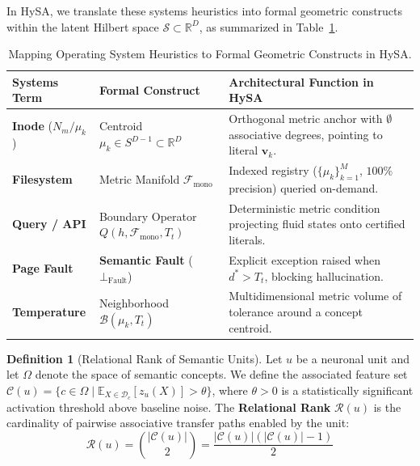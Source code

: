 \documentclass[11pt,a4paper]{article}
\theoremstyle{definition}
\newtheorem{definition}{Definition}
\begin{document}
In HySA, we translate these systems heuristics into formal geometric constructs within the latent Hilbert space $\mathcal{S} \subset \mathbb{R}^D$, as summarized in Table~\ref{tab:systems_mapping}.

\begin{table}[h]
\centering
\caption{Mapping Operating System Heuristics to Formal Geometric Constructs in HySA.}
\label{tab:systems_mapping}
\vspace{0.15cm}
\small
\setlength{\tabcolsep}{4.0pt}
\begin{tabular}{@{}p{3.2cm}p{3.8cm}p{8.5cm}@{}}
\toprule
\textbf{Systems Term} & \textbf{Formal Construct} & \textbf{Architectural Function in HySA} \\ \midrule
\textbf{Inode} ($N_m / \mu_k$) & Centroid $\mu_k \in S^{D-1} \subset \mathbb{R}^D$ & Orthogonal metric anchor with $\emptyset$ associative degrees, pointing to literal $\mathbf{v}_k$. \\[4pt]
\textbf{Filesystem} & Metric Manifold $\mathcal{F}_{\mathrm{mono}}$ & Indexed registry ($\{\mu_k\}_{k=1}^M$, $100\%$ precision) queried on-demand. \\[4pt]
\textbf{Query / API} & Boundary Operator $Q(h, \mathcal{F}_{\mathrm{mono}}, T_t)$ & Deterministic metric condition projecting fluid states onto certified literals. \\[4pt]
\textbf{Page Fault} & \textbf{Semantic Fault} ($\bot_{\mathrm{Fault}}$) & Explicit exception raised when $d^* > T_t$, blocking hallucination. \\[4pt]
\textbf{Temperature} & Neighborhood $\mathcal{B}(\mu_k, T_t)$ & Multidimensional metric volume of tolerance around a concept centroid. \\ \bottomrule
\end{tabular}
\end{table}

\begin{definition}[Relational Rank of Semantic Units]
Let $u$ be a neuronal unit and let $\Omega$ denote the space of semantic concepts. We define the associated feature set $\mathcal{C}(u) = \{c \in \Omega \mid \mathbb{E}_{X \in \mathcal{D}_c}[z_u(X)] > \theta\}$, where $\theta > 0$ is a statistically significant activation threshold above baseline noise. The \textbf{Relational Rank} $\mathcal{R}(u)$ is the cardinality of pairwise associative transfer paths enabled by the unit:
\begin{equation}
    \mathcal{R}(u) = \binom{|\mathcal{C}(u)|}{2} = \frac{|\mathcal{C}(u)| (|\mathcal{C}(u)| - 1)}{2}
\end{equation}
\end{definition}
\end{document}
